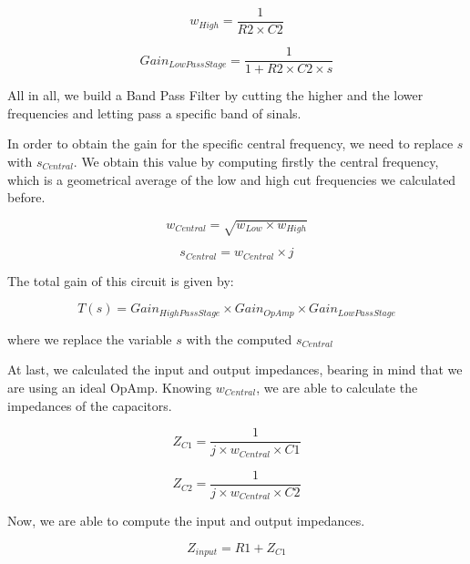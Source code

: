 \begin{equation}
w_{High} = \frac{1}{R2 \times C2}
\label{eq:1.4}
\end{equation}

\begin{equation}
Gain_{Low Pass Stage} = \frac{1}{1 + R2 \times C2 \times s}
\label{eq:1.5}
\end{equation}

\par All in all, we build a Band Pass Filter by cutting the higher and the lower frequencies and letting pass a specific band of sinals.

In order to obtain the gain for the specific central frequency, we need to replace $s$ with $s_{Central}$. We obtain this value by computing firstly the central frequency, which is a geometrical average of the low and high cut frequencies we calculated before.

\begin{equation}
w_{Central} = \sqrt{w_{Low} \times w_{High}}
\label{eq:1.6}
\end{equation}

\begin{equation}
s_{Central} = w_{Central} \times j
\label{eq:1.7}
\end{equation}

The total gain of this circuit is given by:

\begin{equation}
T(s) = Gain_{High Pass Stage} \times Gain_{OpAmp} \times Gain_{Low Pass Stage}
\label{eq:1.8}
\end{equation}

where we replace the variable $s$ with the computed $s_{Central}$

At last, we calculated the input and output impedances, bearing in mind that we are using an ideal OpAmp. Knowing $w_{Central}$, we are able to calculate the impedances of the capacitors.

\begin{equation}
Z_{C1} = \frac{1}{j \times w_{Central} \times C1}
\label{eq:1.9}
\end{equation}

\begin{equation}
Z_{C2} = \frac{1}{j \times w_{Central} \times C2}
\label{eq:1.10}
\end{equation}

Now, we are able to compute the input and output impedances.

\begin{equation}
Z_{input} = R1 + Z_{C1}
\label{eq:1.11}
\end{equation}

